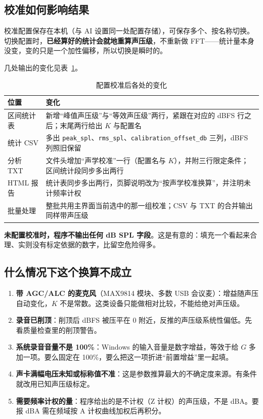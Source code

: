 \documentclass[UTF8,a4paper,12pt,scheme=chinese]{ctexart}
\begin{document}
\subsection{校准如何影响结果}

校准配置保存在本机（与 AI 设置同一处配置存储），可保存多个、按名称切换。切换配置时，\textbf{已经算好的统计会就地重算声压级}，不重新做 FFT——统计量本身没变，变的只是一个加性偏移，所以切换是瞬时的。

几处输出的变化见表~\ref{tab:calib_outputs}。

\begin{table}[htbp]
\centering
\caption{配置校准后各处的变化}
{\small
\begin{tabular}{@{}>{\raggedright\arraybackslash}p{3.4cm}>{\raggedright\arraybackslash}p{10.4cm}@{}}
\toprule
位置 & 变化 \\
\midrule
区间统计表 & 新增“峰值声压级”与“等效声压级”两行，紧跟在对应的 dBFS 行之后；末尾两行给出 $K$ 与配置名 \\
统计 CSV & 多出 \texttt{peak\_spl}、\texttt{rms\_spl}、\texttt{calibration\_offset\_db} 三列，dBFS 列照旧保留 \\
分析 TXT & 文件头增加“声学校准”一行（配置名与 $K$），并附三行限定条件；区间统计段同步多出两行 \\
HTML 报告 & 统计表同步多出两行，页脚说明改为“按声学校准换算”，并注明未计频率计权 \\
批量处理 & 整批共用主界面当前选中的那一组校准；CSV 与 TXT 的合并输出同样带声压级 \\
\bottomrule
\end{tabular}}
\label{tab:calib_outputs}
\end{table}

\textbf{未配置校准时，程序不输出任何 dB SPL 字段}。这是有意的：填充一个看起来合理、实则没有标定依据的数字，比留空危险得多。

\subsection{什么情况下这个换算不成立}

\begin{enumerate}
  \item \textbf{带 AGC/ALC 的麦克风}（MAX9814 模块、多数 USB 会议麦）：增益随声压自动变化，$K$ 不是常数。这类设备只能做相对比较，不能给绝对声压级。
  \item \textbf{录音已削顶}：削顶后 dBFS 被压平在 0 附近，反推的声压级系统性偏低。先看质量检查里的削顶警告。
  \item \textbf{系统录音音量不是 100\%}：Windows 的输入音量是数字增益，等效于给 $G$ 多加一项。要么固定在 100\%，要么把这一项折进“前置增益”里一起填。
  \item \textbf{声卡满幅电压未知或标称值不准}：这是参数推算最大的不确定度来源。有条件就改用已知声压级标定。
  \item \textbf{需要频率计权的量}：程序给出的是不计权（Z 计权）的声压级，不是 dBA。要报 dBA 需在频域按 A 计权曲线加权后再积分。
\end{enumerate}
\end{document}
